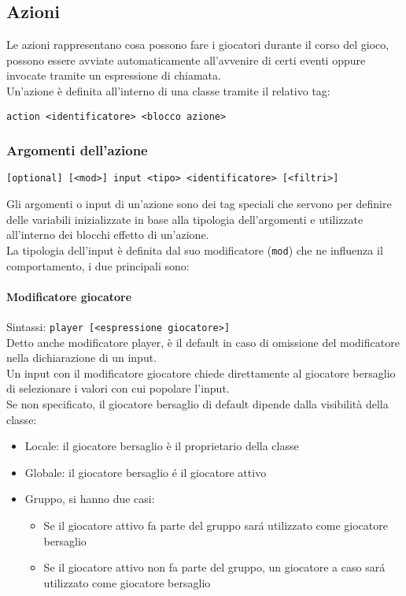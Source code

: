 \subsection{Azioni}
Le azioni rappresentano cosa possono fare i giocatori durante il corso del gioco, possono essere avviate
automaticamente all'avvenire di certi eventi oppure invocate tramite un espressione di chiamata.\\
Un'azione è definita all'interno di una classe tramite il relativo tag: \\
\begin{lstlisting}
action <identificatore> <blocco azione>
\end{lstlisting}

\subsubsection{Argomenti dell'azione}
\begin{lstlisting}
[optional] [<mod>] input <tipo> <identificatore> [<filtri>]
\end{lstlisting}
Gli argomenti o input di un’azione sono dei tag speciali che servono per definire delle variabili 
inizializzate in base alla tipologia dell’argomenti e utilizzate all’interno dei 
blocchi effetto di un’azione. \\
La tipologia dell'input è definita dal suo modificatore (\verb|mod|) che ne influenza il comportamento, 
i due principali sono:

\paragraph{Modificatore giocatore}
Sintassi: \verb|player [<espressione giocatore>]| \\
Detto anche modificatore player, è il default in caso di omissione del modificatore nella
dichiarazione di un input. \\
Un input con il modificatore giocatore chiede direttamente al giocatore bersaglio di 
selezionare i valori con cui popolare l'input. \\
Se non specificato, il giocatore bersaglio di default dipende dalla visibilità della classe:
\begin{itemize}
    \item Locale: il giocatore bersaglio è il proprietario della classe
    \item Globale: il giocatore bersaglio é il giocatore attivo 
    \item {
        Gruppo, si hanno due casi:
        \begin{itemize}
            \item Se il giocatore attivo fa parte del gruppo sará utilizzato come giocatore bersaglio
            \item Se il giocatore attivo non fa parte del gruppo, un giocatore a caso sará utilizzato come giocatore bersaglio
        \end{itemize}
    }
\end{itemize}

